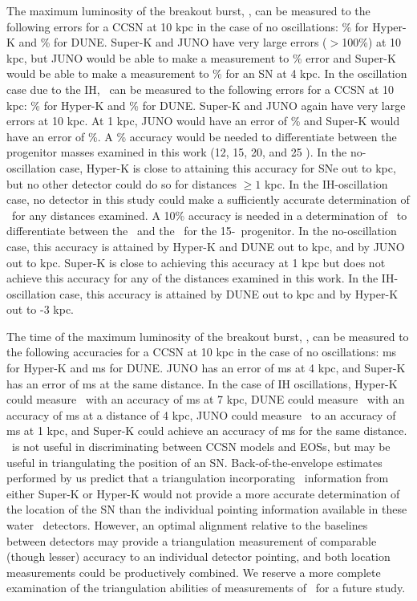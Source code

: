 The maximum luminosity of the breakout burst, \lmax, can be measured
to the following errors for a CCSN at 10 kpc in the case of no
oscillations:  \% for Hyper-K and \% for DUNE.  
Super-K and JUNO have very large errors ($>$100\%) at
10 kpc, but JUNO would be able to make a measurement to \%
error and Super-K would be able to make a measurement to \%
for an SN at 4 kpc.  
In the oscillation case due to the IH, \lmax\ can be measured to the
following errors for a CCSN at 10 kpc: \% for Hyper-K and
\% for DUNE.  Super-K and JUNO again have very
large errors at 10 kpc. At 1 kpc, JUNO would have an error of \% 
and Super-K would have an error of \%.
A \% accuracy would be needed to
differentiate between the progenitor masses examined in this work (12,
15, 20, and 25 \Msol).  In the no-oscillation case, 
Hyper-K is close to attaining this accuracy 
for SNe out to  kpc, but no other
detector could do so for distances ${\geq}1$ kpc.  In the
IH-oscillation case, no detector in this study could make a
sufficiently accurate determination of \lmax\ for any distances examined. 
A 10\% accuracy is
needed in a determination of \lmax\ 
to differentiate between the \ls\ and the \shen\ for the
15-\Msol\ progenitor.  In the no-oscillation case, 
this accuracy is attained by Hyper-K and DUNE out to  kpc, 
 and by JUNO out to \abt 1 kpc.  Super-K is close to achieving this
 accuracy at 1 kpc but does not achieve this accuracy for any of the
 distances examined in this work.
In the IH-oscillation case, this accuracy is attained by DUNE out to
 kpc and by Hyper-K out to \abt 2-3 kpc. 

The time of the maximum luminosity of the breakout burst, \tmax, can
be measured to the following accuracies for a CCSN at 10 kpc in the
case of no oscillations: \abt 1.3 ms for Hyper-K and \abt 1.5 ms for DUNE.
JUNO has an error of \abt 2 ms at 4 kpc, and Super-K has an error
of \abt 2.5 ms at the same distance.
In the case of IH oscillations, Hyper-K could measure \tmax\ with an
accuracy of \abt 3 ms at 7 kpc, DUNE could measure \tmax\ with an
accuracy of \abt 2 ms at a distance of 4 kpc, JUNO 
could measure \tmax\ to an accuracy of  ms at 1 kpc, and
Super-K could achieve an accuracy of \abt 2 ms for the same distance.
\tmax\ is
not useful in discriminating between CCSN models and EOSs, 
but may be useful in triangulating the position of an 
SN. Back-of-the-envelope estimates performed by us predict that
a triangulation incorporating \tmax\ information from either Super-K
or Hyper-K would not provide a more accurate determination of the
location of the SN than the individual pointing information
available in these water \cer\ detectors.  However, an optimal
alignment relative to the baselines between detectors may provide a
triangulation measurement of comparable (though lesser) accuracy to an
individual detector pointing, and both location measurements could be
productively combined.  We reserve a more complete examination of the
triangulation abilities of measurements of \tmax\ for a future study.


